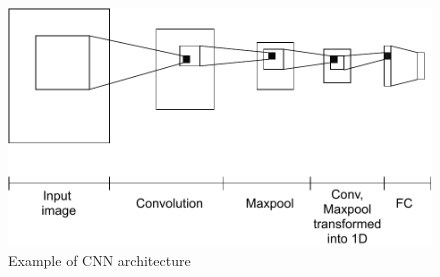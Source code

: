     \begin{figure}
        \centering
        \includegraphics[width=.8\linewidth]{images/cnn.pdf}
        \caption{Example of CNN architecture}
        \label{fig:cnn}
    \end{figure}

